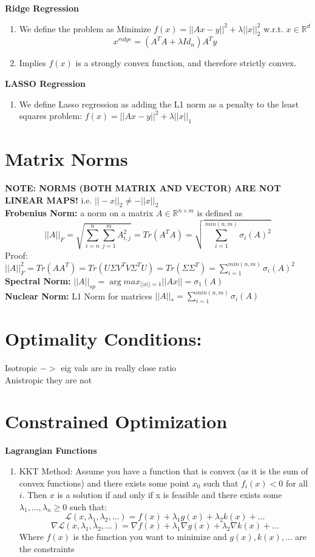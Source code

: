 \documentclass[12pt,twoside]{article}
\newcommand{\Lagr}{\mathcal{L}}
\newcommand{\R}{\mathbb{R}}
\begin{document}
\textbf{Ridge Regression}
\begin{enumerate}
    \item We define the problem as Minimize $f(x) = ||Ax-y||^2 + \lambda ||x||_2^2$ w.r.t. $x\in \R^d$
    $$
    x^{ridge} = (A^TA + \lambda Id_n)A^Ty
    $$
    \item Implies $f(x)$ is a strongly convex function, and therefore strictly convex.
\end{enumerate}
\textbf{LASSO Regression}
\begin{enumerate}
    \item We define Lasso regression as adding the L1 norm as a penalty to the least squares problem: $f(x) = ||Ax-y||^2 + \lambda ||x||_1$
\end{enumerate}
    
\section*{Matrix Norms}
\textbf{NOTE: NORMS (BOTH MATRIX AND VECTOR) ARE NOT LINEAR MAPS!} i.e. $||-x||_2 \neq -||x||_2$ \\
\textbf{Frobenius Norm:} a norm on a matrix $A \in \R^{n \times m}$ is defined as $$
        ||A||_F = \sqrt{\sum_{i=n}^n \sum_{j=1}^m A_{i,j}^2} = Tr(A^TA) = \sqrt{\sum_{i=1}^{min(n,m)} \sigma_i (A)^2}
$$
Proof: $||A||_F^2 = Tr(AA^T) = Tr( U\Sigma V^T V \Sigma^T U) = Tr(\Sigma \Sigma ^T) = \sum_{i=1}^{min(n,m)} \sigma_i (A)^2$ \\ 
\textbf{Spectral Norm:} $||A||_{sp} = \arg max_{||x||=1} ||Ax|| = \sigma_1 (A) $ \\
\textbf{Nuclear Norm:} L1 Norm for matrices $||A||_* = \sum_{i=1}^{min(n,m)} \sigma_i (A)$
\section*{Optimality Conditions:}
Isotropic $->$ eig vals are in really close ratio\\
Anistropic they are not
\section*{Constrained Optimization}
\textbf{Lagrangian Functions}
\begin{enumerate}
    \item KKT Method: Assume you have a function that is convex (as it is the sum of convex functions) and there exists some point $x_0$ such that $f_i(x) < 0$ for all $i$. Then $x$ is a solution if and only if x is feasible and there exists some $\lambda_1, \dots, \lambda_n \geq 0$ such that:
    $$
    \Lagr (x,\lambda_1, \lambda_2, \dots) =  f(x) + \lambda_1 g(x) + \lambda_2 k(x) + \dots
    $$
    $$
    \nabla \Lagr (x,\lambda_1, \lambda_2, \dots) = \nabla f(x) + \lambda_1 \nabla g(x) + \lambda_2 \nabla k(x) + \dots
    $$
    Where $f(x)$ is the function you want to minimize and $g(x), k(x), \dots$ are the constraints
\end{enumerate}\
\end{document}
